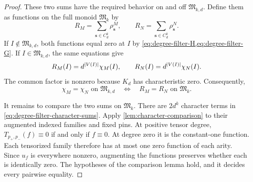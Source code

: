 \documentclass[11pt,letterpaper,onecolumn]{article}
\theoremstyle{plain}
\theoremstyle{definition}
\theoremstyle{remark}
\newcommand{\InstMonoid}[1]{\mathfrak M_{#1}}
\DeclarePairedDelimiter{\abs}{\lvert}{\rvert}
\begin{document}
\begin{proof}
These two sums have the required behavior on and off
$\mathfrak M_{k,d}$.  Define them as functions on the full monoid
$\InstMonoid{k}$ by
\begin{equation}
  R_M=\sum_{\mathbf s\in C_d^k}\rho^M_{\mathbf s},
  \qquad
  R_N=\sum_{\mathbf s\in C_d^k}\rho^N_{\mathbf s}.
  \label{eq:degree-filter-character-sums}
\end{equation}
If $I\notin\mathfrak M_{k,d}$, both functions equal zero at $I$ by
\cref{eq:degree-filter-H,eq:degree-filter-G}.  If
$I\in\mathfrak M_{k,d}$, the same equations give
\[
  R_M(I)=d^{\abs{V(I)}}\chi_M(I),
  \qquad
  R_N(I)=d^{\abs{V(I)}}\chi_N(I).
\]
The common factor is nonzero because $K_d$ has characteristic zero.
Consequently,
\begin{equation}
  \chi_M=\chi_N\text{ on }\mathfrak M_{k,d}
  \quad\Longleftrightarrow\quad
  R_M=R_N\text{ on }\InstMonoid{k}.
  \label{eq:degree-filter-reduction}
\end{equation}

It remains to compare the two sums on $\InstMonoid{k}$.
There are $2d^k$ character terms in
\eqref{eq:degree-filter-character-sums}.  Apply
\cref{lem:character-comparison} to their augmented indexed families and
fixed pins.  At positive tensor degree, $T_{p_+,p_-}(f)\equiv0$ if and only
if $f\equiv0$. At degree zero it is the constant-one function.  Each
tensorized family therefore has at most one zero function of each arity.
Since $u_f$ is everywhere nonzero, augmenting the functions preserves
whether each is identically zero.  The hypotheses of the comparison lemma
hold, and it decides every pairwise equality.


\end{proof}
\end{document}
